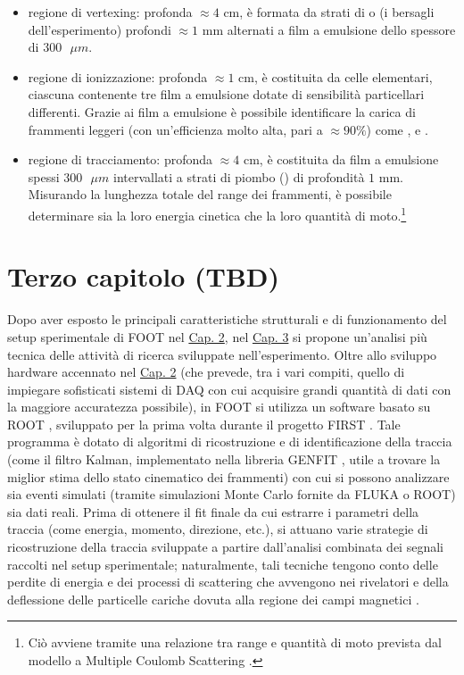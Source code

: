 \documentclass[12pt,a4paper,twoside]{report}
\begin{document}
	\begin{itemize}
		\item regione di vertexing: profonda $\approx4\mbox{ cm}$, è formata da strati di  o  (i bersagli dell'esperimento) profondi $\approx1\mbox{ mm}$ alternati a film a emulsione dello spessore di $300\mbox{ }\mu{m}$.
		\item regione di ionizzazione: profonda $\approx1\mbox{ cm}$, è costituita da celle elementari, ciascuna contenente tre film a emulsione dotate di sensibilità particellari differenti. Grazie ai film a emulsione è possibile identificare la carica di frammenti leggeri (con un'efficienza molto alta, pari a $\approx90\%$) come ,  e  \cite{deLellisConference}.
		\item regione di tracciamento: profonda $\approx4\mbox{ cm}$, è costituita da film a emulsione spessi $300\mbox{ }\mu{m}$ intervallati a strati di piombo () di profondità $1\mbox{ mm}$. Misurando la lunghezza totale del range dei frammenti, è possibile determinare sia la loro energia cinetica che la loro quantità di moto.\footnote{Ciò avviene tramite una relazione tra range e quantità di moto prevista dal modello a Multiple Coulomb Scattering \cite{articleAgafonova,DESERIO2003539}.}
	\end{itemize}
	
	\chapter{Terzo capitolo (TBD)}\label{cap:3}
	Dopo aver esposto le principali caratteristiche strutturali e di funzionamento del setup sperimentale di FOOT nel \hyperref[cap:2]{Cap. 2}, nel \hyperref[cap:3]{Cap. 3} si propone un'analisi più tecnica delle attività di ricerca sviluppate nell'esperimento. Oltre allo sviluppo hardware accennato nel \hyperref[cap:2]{Cap. 2} (che prevede, tra i vari compiti, quello di impiegare sofisticati sistemi di DAQ con cui acquisire grandi quantità di dati con la maggiore accuratezza possibile), in FOOT si utilizza un software basato su ROOT \cite{rene_brun}, sviluppato per la prima volta durante il progetto FIRST \cite{foot_cdr}. Tale programma è dotato di algoritmi di ricostruzione e di identificazione della traccia (come il filtro Kalman, implementato nella libreria GENFIT \cite{Rauch_2015}, utile a trovare la miglior stima dello stato cinematico dei frammenti) con cui si possono analizzare sia eventi simulati (tramite simulazioni Monte Carlo fornite da FLUKA o ROOT) sia dati reali. Prima di ottenere il fit finale da cui estrarre i parametri della traccia (come energia, momento, direzione, etc.), si attuano varie strategie di ricostruzione della traccia sviluppate a partire dall'analisi combinata dei segnali raccolti nel setup sperimentale; naturalmente, tali tecniche tengono conto delle perdite di energia e dei processi di scattering che avvengono nei rivelatori e della deflessione delle particelle cariche dovuta alla regione dei campi magnetici \cite{ridolfiArticle}.
	
\end{document}
